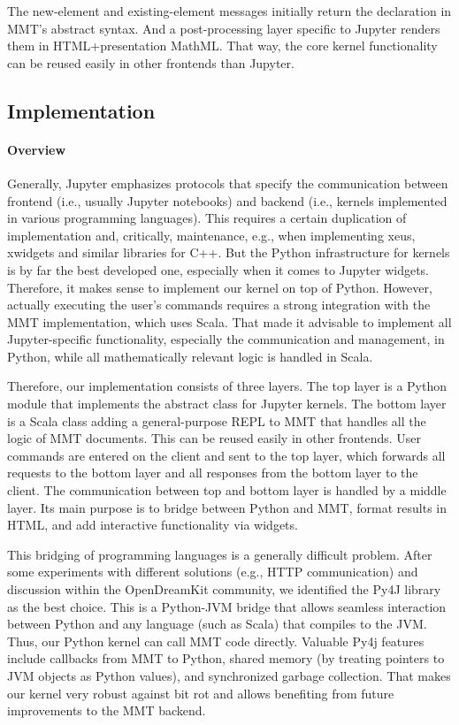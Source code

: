 The new-element and existing-element messages initially return the declaration in MMT's abstract syntax.
And a post-processing layer specific to Jupyter renders them in HTML+presentation MathML.
That way, the core kernel functionality can be reused easily in other frontends than Jupyter.

\subsection{Implementation}\label{sec:kernel:impl}

\paragraph{Overview}
Generally, Jupyter emphasizes protocols that specify the communication between frontend (i.e., usually Jupyter notebooks) and backend (i.e., kernels implemented in various programming languages).
This requires a certain duplication of implementation and, critically, maintenance, e.g., when implementing xeus, xwidgets and similar libraries for C++.
But the Python infrastructure for kernels is by far the best developed one, especially when it comes to Jupyter widgets. 
Therefore, it makes sense to implement our kernel on top of Python.
However, actually executing the user's commands requires a strong integration with the MMT implementation, which uses Scala.
That made it advisable to implement all Jupyter-specific functionality, especially the communication and management, in Python, while all mathematically relevant logic is handled in Scala.

Therefore, our implementation consists of three layers.
The top layer is a Python module that implements the abstract class for Jupyter kernels.
The bottom layer is a Scala class adding a general-purpose REPL to MMT that handles all the logic of MMT documents.
This can be reused easily in other frontends.
User commands are entered on the client and sent to the top layer, which forwards all requests to the bottom layer and all responses from the bottom layer to the client.
The communication between top and bottom layer is handled by a middle layer.
Its main purpose is to bridge between Python and MMT, format results in HTML, and add interactive functionality via widgets.

This bridging of programming languages is a generally difficult problem.
After some experiments with different solutions (e.g., HTTP communication) and discussion within the OpenDreamKit community, we identified the Py4J library~\cite{Py4J:on} as the best choice.
This is a Python-JVM bridge that allows seamless interaction between Python and any language (such as Scala) that compiles to the JVM.
Thus, our Python kernel can call MMT code directly.
Valuable Py4j features include callbacks from MMT to Python, shared memory (by treating pointers to JVM objects as Python values), and synchronized garbage collection.
That makes our kernel very robust against bit rot and allows benefiting from future improvements to the MMT backend.

